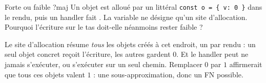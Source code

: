 \begin{exercice}{Forte ou faible ?}{maj}
  Un objet est alloué par un littéral \texttt{const o = \{ v: 0 \}} dans le
  rendu, puis un handler fait . La variable  ne désigne
  qu'un site d'allocation. Pourquoi l'écriture sur le tas doit-elle
  néanmoins rester faible ?
\end{exercice}
\begin{solution}
  Le site d'allocation résume \emph{tous} les objets créés à cet endroit, un
  par rendu : un seul objet concret reçoit l'écriture, les autres gardent
  $0$. Et le handler peut ne jamais s'exécuter, ou s'exécuter sur un seul
  chemin. Remplacer $0$ par $1$ affirmerait que tous ces objets valent $1$ :
  une sous-approximation, donc un FN possible.
\end{solution}

